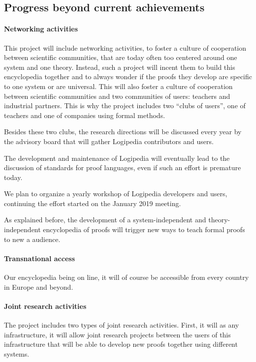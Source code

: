 \subsection{Progress beyond current achievements}


\paragraph{Networking activities}
This project will include networking activities, to foster a culture
of cooperation between scientific communities, that are today often
too centered around one system and one theory. Instead, such a project
will incent them to build this encyclopedia together and to always
wonder if the proofs they develop are specific to one system or are
universal. This will also foster a culture of cooperation between
scientific communities and two communities of users: teachers and
industrial partners. This is why the project includes two ``clubs of
users'', one of teachers and one of companies using formal methods.

Besides these two clubs, the research directions will be discussed every
year by the advisory board that will gather {\sc Logipedia} contributors
and users.

The development and maintenance of {\sc Logipedia} will eventually lead
to the discussion of standards for proof languages, even if such an
effort is premature today.

We plan to organize a yearly workshop of {\sc Logipedia} developers
and users, continuing the effort started on the January 2019 meeting.

As explained before, the development of a system-independent and
theory-independent encyclopedia of proofs will trigger new
ways to teach formal proofs to new a audience.


\paragraph{Transnational access}
Our encyclopedia being on line, it will of course be accessible from
every country in Europe and beyond.


\paragraph{Joint research activities}
The project includes two types of joint research activities.  First,
it will as any infrastructure, it will allow joint research projects
between the users of this infrastructure that will be able to develop
new proofs together using different systems.

